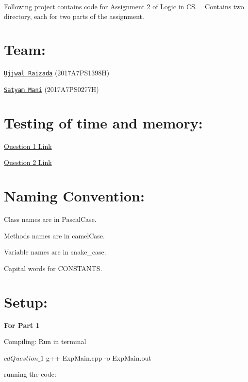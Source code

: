 Following project contains code for Assignment 2 of Logic in CS. ~\newline
Contains two directory, each for two parts of the assignment.

\section*{Team\+:}


\begin{DoxyEnumerate}
\item \href{http://github.com/ujjwalrox}{\tt Ujjwal Raizada} (2017\+A7\+P\+S1398H)
\item \href{http://github.com/sat13mani}{\tt Satyam Mani} (2017\+A7\+P\+S0277H)
\end{DoxyEnumerate}

\section*{Testing of time and memory\+:}


\begin{DoxyEnumerate}
\item \hyperlink{md_Question_1_testcases_for_Question_1}{Question 1 Link}
\item \hyperlink{md_Question_2_testcases_for_Question_2}{Question 2 Link}
\end{DoxyEnumerate}

\section*{Naming Convention\+:}


\begin{DoxyEnumerate}
\item Class names are in {\ttfamily Pascal\+Case}.
\item Methods names are in {\ttfamily camel\+Case}.
\item Variable names are in {\ttfamily snake\+\_\+case}.
\item Capital words for {\ttfamily C\+O\+N\+S\+T\+A\+N\+TS}.
\end{DoxyEnumerate}

\section*{Setup\+:}

{\bfseries For Part 1}


\begin{DoxyEnumerate}
\item Compiling\+: Run in terminal~\newline
 
\begin{DoxyCode}
$ cd Question\_1
$ g++ ExpMain.cpp -o ExpMain.out
\end{DoxyCode}

\item running the code\+: 

\end{DoxyEnumerate}

